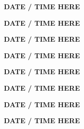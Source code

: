 \documentclass[12pt]{extbook}
\newcommand{\abstract}[2]{{
\begin{center}
\bfseries #1
\end{center}}
\par
}
\begin{document}

\abstract{DATE / TIME HERE}{abstracts/Ortega} %


\abstract{DATE / TIME HERE}{abstracts/GroegerTrampe} %
\abstract{DATE / TIME HERE}{abstracts/vanRooyen} %
\abstract{DATE / TIME HERE}{abstracts/Zhao} %
\abstract{DATE / TIME HERE}{abstracts/Musy} %



\abstract{DATE / TIME HERE}{abstracts/Iwe}
\abstract{DATE / TIME HERE}{abstracts/Slagter} %

\abstract{DATE / TIME HERE}{abstracts/Marion} %









\end{document}

